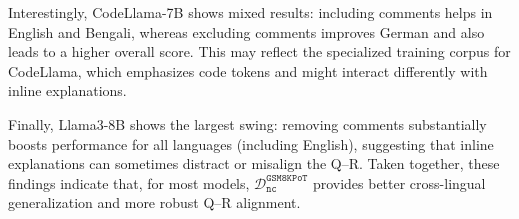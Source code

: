 Interestingly, CodeLlama-7B shows mixed results: including comments helps in English and Bengali, whereas excluding comments improves German and also leads to a higher overall score.
%
This may reflect the specialized training corpus for CodeLlama, which emphasizes code tokens and might interact differently with inline explanations.  

%
Finally, Llama3-8B shows the largest swing: removing comments substantially boosts performance for all languages (including English), suggesting that inline explanations can sometimes distract or misalign the Q–R.
%
Taken together, these findings indicate that, for most models, \(\mathcal{D}^\texttt{GSM8KPoT}_\texttt{nc}\) provides better cross-lingual generalization and more robust Q–R alignment.


\begin{table*}[htbp]
\tiny
\centering
{}
\end{table*}
